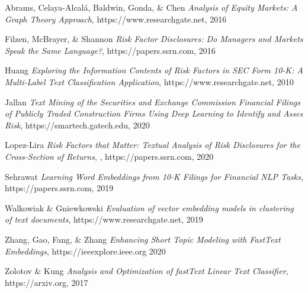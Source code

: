 \documentclass[11pt]{article}
\begin{document}
\begin{thebibliography}{shortest-entry}

 Abrams, Celaya-Alcalá, Baldwin, Gonda, \& Chen \textit{Analysis of Equity Markets: A Graph Theory Approach}, https://www.researchgate.net, 2016

 Filzen, McBrayer, \& Shannon \textit{Risk Factor Disclosures: Do Managers and Markets Speak the Same Language?}, https://papers.ssrn.com, 2016

 Huang \textit{Exploring the Information Contents of Risk Factors in SEC Form 10-K: A Multi-Label Text Classification Application}, https://www.researchgate.net, 2010

 Jallan \textit{Text Mining of the Securities and Exchange Commission Financial Filings of Publicly Traded Construction Firms Using Deep Learning to Identify and Asses Risk}, https://smartech.gatech.edu, 2020

 Lopez-Lira \textit{Risk Factors that Matter: Textual Analysis of Risk
Disclosures for the Cross-Section of Returns}, , https://papers.ssrn.com, 2020

 Sehrawat \textit{Learning Word Embeddings from 10-K Filings
for Financial NLP Tasks}, https://papers.ssrn.com, 2019

 Walkowiak \& Gniewkowski \textit{Evaluation of vector embedding models in clustering of text documents}, https://www.researchgate.net, 2019

 Zhang, Gao, Fang, \& Zhang \textit{Enhancing Short Topic Modeling with FastText Embeddings}, https://ieeexplore.ieee.org 2020

 Zolotov \& Kung \textit{Analysis and Optimization of fastText Linear Text Classifier}, https://arxiv.org, 2017

\end{thebibliography}
\end{document}
